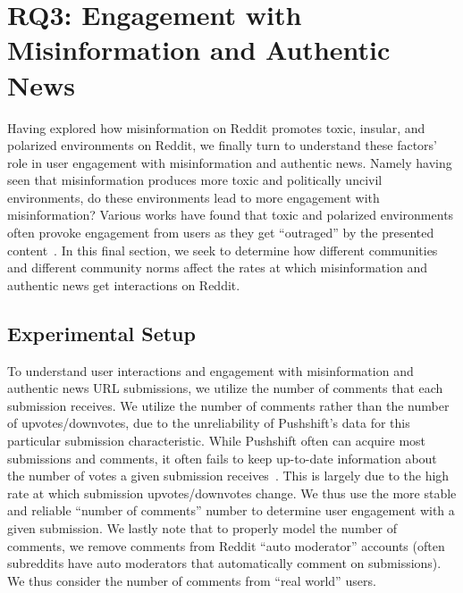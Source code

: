 \section{RQ3: Engagement with Misinformation and Authentic News}
Having explored how misinformation on Reddit promotes toxic, insular, and polarized environments on Reddit, we finally turn to understand these factors' role in user engagement with misinformation and authentic news.  Namely having seen that misinformation produces more toxic and politically uncivil environments, do these environments lead to more engagement with misinformation? Various works have found that toxic and polarized environments often provoke engagement from users as they get ``outraged'' by the presented content~\cite{kim2021distorting,gallacher2021online}. In this final section, we seek to determine how different communities and different community norms affect the rates at which misinformation and authentic news get interactions on Reddit.

\subsection{Experimental Setup} To understand user interactions and engagement with misinformation and authentic news URL submissions, we utilize the number of comments that each submission receives. We utilize the number of comments rather than the number of upvotes/downvotes, due to the unreliability of Pushshift's data for this particular submission characteristic. While Pushshift often can acquire most submissions and comments, it often fails to keep up-to-date information about the number of votes a given submission receives~\cite{baumgartner2020pushshift}. This is largely due to the high rate at which submission upvotes/downvotes change. We thus use the more stable and reliable ``number of comments'' number to determine user engagement with a given submission. We lastly note that to properly model the number of comments, we remove comments from Reddit ``auto moderator'' accounts (often subreddits have auto moderators that automatically comment on submissions). We thus consider the number of comments from ``real world'' users. 

